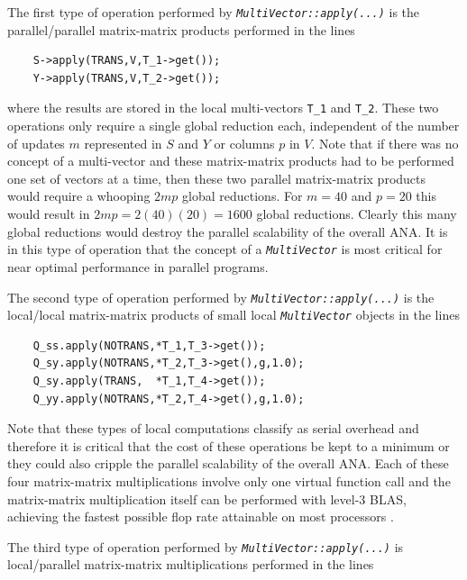\documentclass[10pt,fleqn]{article}
\begin{document}
The first type of operation performed by
\texttt{\textit{MultiVector\-::apply(...)}} is the parallel/parallel
matrix-matrix products performed in the lines

{\scriptsize\begin{verbatim}
    S->apply(TRANS,V,T_1->get());
    Y->apply(TRANS,V,T_2->get());
\end{verbatim}}

where the results are stored in the local multi-vectors 
\texttt{T\_1} and \texttt{T\_2}.  These two operations only
require a single global reduction each, independent of the number of
updates $m$ represented in $S$ and $Y$ or columns $p$ in $V$.  Note
that if there was no concept of a multi-vector and these matrix-matrix
products had to be performed one set of vectors at a time, then these
two parallel matrix-matrix products would require a whooping $2 m p$
global reductions.  For $m = 40$ and $p = 20$ this would result in $2
m p = 2(40)(20) = 1600$ global reductions.  Clearly this many global
reductions would destroy the parallel scalability of the overall ANA.
It is in this type of operation that the concept of a
\texttt{\textit{MultiVector}} is most critical for near optimal
performance in parallel programs.

The second type of operation performed by
\texttt{\textit{MultiVector\-::apply(...)}} is the local/local matrix-matrix
products of small local \texttt{\textit{MultiVector}} objects in the
lines

{\scriptsize\begin{verbatim}
    Q_ss.apply(NOTRANS,*T_1,T_3->get());
    Q_sy.apply(NOTRANS,*T_2,T_3->get(),g,1.0);
    Q_sy.apply(TRANS,  *T_1,T_4->get());
    Q_yy.apply(NOTRANS,*T_2,T_4->get(),g,1.0);
\end{verbatim}}

Note that these types of local computations classify as serial
overhead and therefore it is critical that the cost of these
operations be kept to a minimum or they could also cripple the
parallel scalability of the overall ANA.  Each of these four
matrix-matrix multiplications involve only one virtual function call
and the matrix-matrix multiplication itself can be performed with
level-3 BLAS, achieving the fastest possible flop rate attainable on
most processors \cite{ref:demmel_1997}.

The third type of operation performed by
\texttt{\textit{MultiVector\-::apply(...)}} is local/parallel matrix-matrix
multiplications performed in the lines
\end{document}
